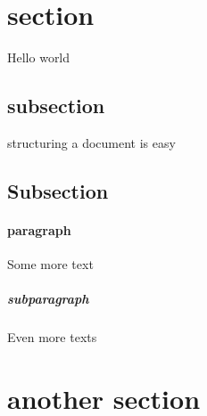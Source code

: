 \documentclass{article}
\begin{document}
 	\section{section}
 	Hello world
 	\subsection{subsection}
 	structuring a document is easy
 	\subsection{Subsection}
 	\paragraph{paragraph}
 	Some more text
 	\subparagraph{subparagraph}
 	Even more texts
 	\section{another section}
 
\end{document}
